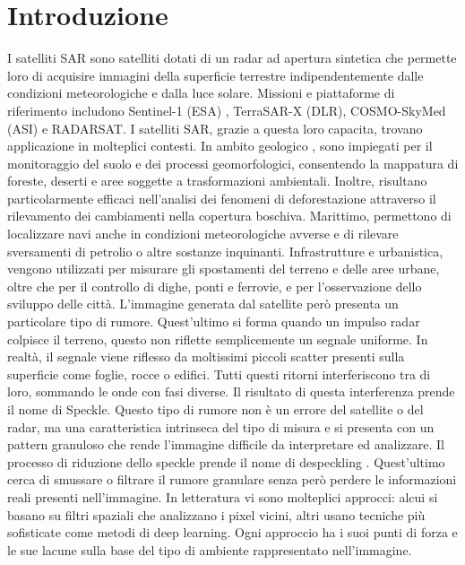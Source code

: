 
\chapter{Introduzione}
I satelliti SAR sono satelliti dotati di un radar ad apertura sintetica che permette
loro di acquisire immagini della superficie terrestre indipendentemente dalle 
condizioni meteorologiche e dalla luce solare. 
Missioni e piattaforme di riferimento includono Sentinel-1 (ESA) \cite{esa_sentinel1}, TerraSAR-X (DLR), 
COSMO-SkyMed (ASI) e RADARSAT.
I satelliti SAR, grazie a questa loro 
capacita, trovano applicazione in molteplici contesti. In ambito geologico \cite{nhess-20-2379-2020}, 
sono impiegati per il monitoraggio del suolo e dei processi 
geomorfologici, consentendo la mappatura di foreste, deserti e aree soggette a 
trasformazioni ambientali. Inoltre, risultano particolarmente efficaci nell’analisi 
dei fenomeni di deforestazione attraverso il rilevamento dei cambiamenti nella 
copertura boschiva. Marittimo, permettono di localizzare navi anche in condizioni 
meteorologiche avverse e di rilevare sversamenti di petrolio o altre sostanze 
inquinanti. Infrastrutture e urbanistica, vengono utilizzati per misurare gli 
spostamenti del terreno e delle aree urbane, oltre che per il controllo di dighe, 
ponti e ferrovie, e per l’osservazione dello sviluppo delle città. 
L'immagine generata dal satellite però presenta un particolare tipo di rumore. Quest'ultimo si forma quando un impulso radar colpisce il terreno, 
questo non riflette semplicemente un segnale uniforme. In realtà, il segnale viene riflesso da 
moltissimi piccoli scatter presenti sulla superficie come foglie, rocce o edifici. 
Tutti questi ritorni interferiscono tra di loro, sommando le onde con fasi diverse. Il risultato di questa 
interferenza prende il nome di Speckle. Questo tipo di rumore non è un errore del satellite o 
del radar, ma una caratteristica intrinseca del tipo di misura e si presenta con un pattern granuloso
che rende l'immagine difficile da interpretare ed analizzare.
Il processo di riduzione dello speckle 
prende il nome di despeckling \cite{1097762}. Quest'ultimo cerca di smussare o filtrare il rumore granulare senza 
però perdere le informazioni reali presenti nell'immagine. In letteratura vi sono molteplici 
approcci: alcui si basano su filtri spaziali che analizzano i pixel vicini, altri usano tecniche 
più sofisticate come metodi di deep learning. Ogni approccio ha i suoi
punti di forza e le sue lacune sulla base del tipo di ambiente rappresentato nell'immagine. 
